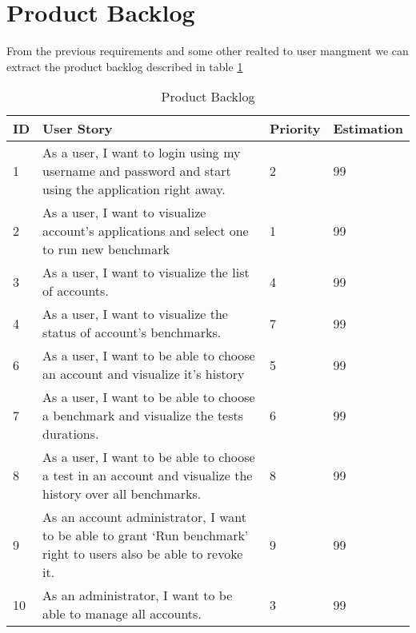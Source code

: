 \section{Product Backlog}
From the previous requirements and some other realted to user mangment we can
extract the product backlog described in table \hyperref[product-backlog]{\ref{product-backlog}}

\begin{table}[!hp]
\caption{Product Backlog}
\label{product-backlog}
\centering
  \begin{tabular}{ | p{2cm}  | p{7cm}  | p{2cm} | p{2cm}| }
    \hline

    ID & User Story                                                                                                        & Priority        & Estimation\\ \hline

    1 & As a user, I want to login using my username and password and start using the application right away.              & 2              & 99        \\ \hline
    2 & As a user, I want to visualize account’s applications and select one to run new benchmark                          & 1              & 99        \\ \hline
    3 & As a user, I want to visualize the list of accounts.                                                               & 4              & 99        \\ \hline
    4 & As a user, I want to visualize the status of account’s benchmarks.                                                 & 7              & 99        \\ \hline
    6 & As a user, I want to be able to choose an account and visualize it’s history                                       & 5              & 99        \\ \hline
    7 & As a user, I want to be able to choose a benchmark and visualize the tests durations.                              & 6              & 99        \\ \hline
    8 & As a user, I want to be able to choose a test in an account and visualize the history over all benchmarks.         & 8              & 99        \\ \hline
    9 & As an account administrator, I want to be able to grant ‘Run benchmark’  right to users also be able to revoke it. & 9              & 99        \\ \hline
    10 & As an administrator, I want to be able to manage all accounts.                                                    & 3              & 99        \\ \hline

    \hline
  \end{tabular}
\end{table}

